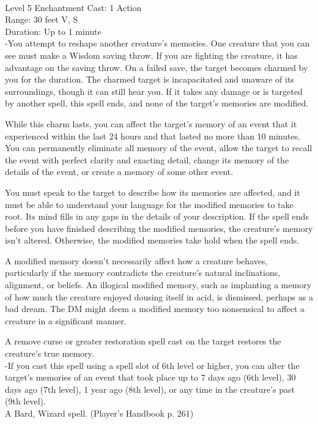 \documentclass[10pt,twocolumn]{report}
\begin{document}
 \\
Level 5 \quad Enchantment \quad Cast: 1 Action\\
Range: 30 feet \quad V, S\\
Duration: Up to 1 minute \quad \\
-You attempt to reshape another creature’s memories.
One creature that you can see must make a Wisdom saving throw. If you are fighting the creature, it has advantage on the saving throw. On a failed save, the target becomes charmed by you for the duration. The charmed target is incapacitated and unaware of its surroundings, though it can still hear you. If it takes any damage or is targeted by another spell, this spell ends, and none of the target’s memories are modified.

While this charm lasts, you can affect the target’s memory of an event that it experienced within the last 24 hours and that lasted no more than 10 minutes. You can permanently eliminate all memory of the event, allow the target to recall the event with perfect clarity and exacting detail, change its memory of the details of the event, or create a memory of some other event.

You must speak to the target to describe how its memories are affected, and it must be able to understand your language for the modified memories to take root. Its mind fills in any gaps in the details of your description. If the spell ends before you have finished describing the modified memories, the creature’s memory isn’t altered. Otherwise, the modified memories take hold when the spell ends.

A modified memory doesn’t necessarily affect how a creature behaves, particularly if the memory contradicts the creature’s natural inclinations, alignment, or beliefs. An illogical modified memory, such as implanting a memory of how much the creature enjoyed dousing itself in acid, is dismissed, perhaps as a bad dream. The DM might deem a modified memory too nonsensical to affect a creature in a significant manner.

A remove curse or greater restoration spell cast on the target restores the creature’s true memory.\\
-If you cast this spell using a spell slot of 6th level or higher, you can alter the target’s memories of an event that took place up to 7 days ago (6th level), 30 days ago (7th level), 1 year ago (8th level), or any time in the creature’s past (9th level).\\
A Bard, Wizard spell. (Player's Handbook p. 261) \\
\end{document}
